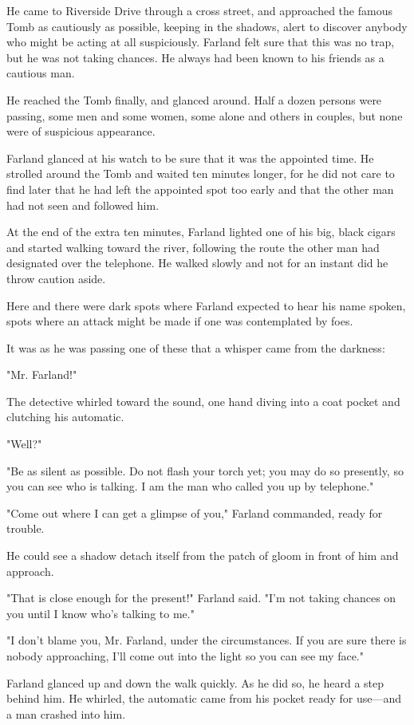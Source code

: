 \documentclass{novel}
\begin{document}
He came to Riverside Drive through a cross street, and approached the famous Tomb as cautiously as possible, keeping in the shadows, alert to discover anybody who might be acting at all suspiciously. Farland felt sure that this was no trap, but he was not taking chances. He always had been known to his friends as a cautious man.

He reached the Tomb finally, and glanced around. Half a dozen persons were passing, some men and some women, some alone and others in couples, but none were of suspicious appearance.

Farland glanced at his watch to be sure that it was the appointed time. He strolled around the Tomb and waited ten minutes longer, for he did not care to find later that he had left the appointed spot too early and that the other man had not seen and followed him.

At the end of the extra ten minutes, Farland lighted one of his big, black cigars and started walking toward the river, following the route the other man had designated over the telephone. He walked slowly and not for an instant did he throw caution aside.

Here and there were dark spots where Farland expected to hear his name spoken, spots where an attack might be made if one was contemplated by foes.

It was as he was passing one of these that a whisper came from the darkness:

"Mr. Farland!"

The detective whirled toward the sound, one hand diving into a coat pocket and clutching his automatic.

"Well?"

"Be as silent as possible. Do not flash your torch yet; you may do so presently, so you can see who is talking. I am the man who called you up by telephone."

"Come out where I can get a glimpse of you," Farland commanded, ready for trouble.

He could see a shadow detach itself from the patch of gloom in front of him and approach.

"That is close enough for the present!" Farland said. "I'm not taking chances on you until I know who's talking to me."

"I don't blame you, Mr. Farland, under the circumstances. If you are sure there is nobody approaching, I'll come out into the light so you can see my face."

Farland glanced up and down the walk quickly. As he did so, he heard a step behind him. He whirled, the automatic came from his pocket ready for use---and a man crashed into him.
\end{document}
